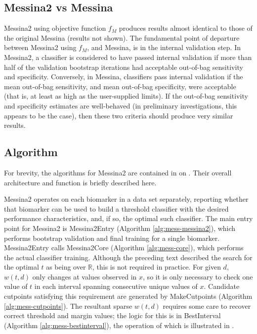 \documentclass[dissertation.tex]{subfiles}
\begin{document}
\subsection{Messina2 vs Messina}
Messina2 using objective function $f_M$ produces results almost identical to those of the original Messina (results not shown).  The fundamental point of departure between Messina2 using $f_M$, and Messina, is in the internal validation step.  In Messina2, a classifier is considered to have passed internal validation if more than half of the validation bootstrap iterations had acceptable out-of-bag sensitivity and specificity.  Conversely, in Messina, classifiers pass internal validation if the mean out-of-bag sensitivity, and mean out-of-bag specificity, were acceptable (that is, at least as high as the user-supplied limits).  If the out-of-bag sensitivity and specificity estimates are well-behaved (in preliminary investigations, this appears to be the case), then these two criteria should produce very similar results.

\subsection{Algorithm}
For brevity, the algorithms for Messina2 are contained in  on .  Their overall architecture and function is briefly described here.

Messina2 operates on each biomarker in a data set separately, reporting whether that biomarker can be used to build a threshold classifier with the desired performance characteristics, and, if so, the optimal such classifier.  The main entry point for Messina2 is Messina2Entry (Algorithm \ref{alg:mess-messina2}), which performs bootstrap validation and final training for a single biomarker.  Messina2Entry calls Messina2Core (Algorithm \ref{alg:mess-core}), which performs the actual classifier training.  Although the preceding text described the search for the optimal $t$ as being over $\mathbb{R}$, this is not required in practice.  For given $d$, $w(t,d)$ only changes at values observed in $x$, so it is only necessary to check one value of $t$ in each interval spanning consecutive unique values of $x$.  Candidate cutpoints satisfying this requirement are generated by MakeCutpoints (Algorithm \ref{alg:mess-cutpoints}).  The resultant sparse $w(t,d)$ requires some care to recover correct threshold and margin values; the logic for this is in BestInterval (Algorithm \ref{alg:mess-bestinterval}), the operation of which is illustrated in .
\end{document}
